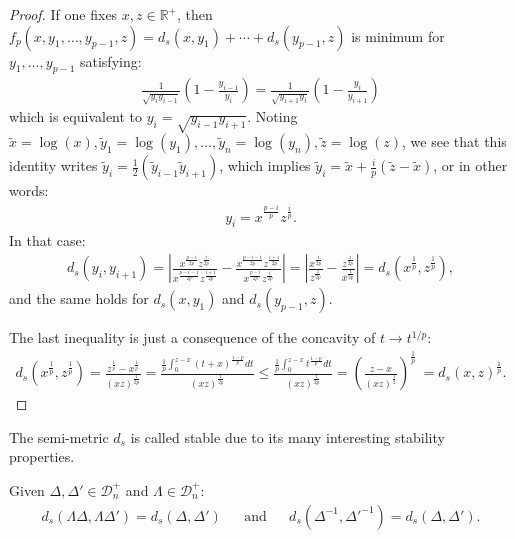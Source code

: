 \documentclass[a4papaer, titlepage]{book}
\begin{document}
\begin{proof}
   If one fixes $x,z \in \mathbb R^+$, then $f_p(x,y_1,\ldots, y_{p-1},z) = d_s(x,y_1) + \cdots + d_s(y_{p-1} ,z)$ is minimum for $y_1,\ldots, y_{p-1}$ satisfying:
   \begin{align*}
     \frac{1}{\sqrt{y_i y_{i-1}}} \left(1- \frac{y_{i-1}}{y_i}\right) = \frac{1}{\sqrt{y_{i+1} y_{i}}} \left(1- \frac{y_{i}}{y_{i+1}}\right)
   \end{align*}
   which is equivalent to $y_i = \sqrt{y_{i-1} y_{i+1}}$. Noting $\tilde x = \log(x),\tilde y_1 = \log({y_1}), \ldots, \tilde y_n = \log({y_n}), \tilde z = \log(z) $, we see that this identity writes $\tilde y_i = \frac{1}{2} (\tilde y_{i-1} \tilde y_{i+1})$, which implies $\tilde y_i = \tilde x + \frac{i}{p} (\tilde z - \tilde x)$, or in other words:
   \begin{align*}
     y_i = x^{\frac{p-i}{p}} z^{\frac{i}{p}}.
   \end{align*}
   In that case:
   \begin{align*}
     d_s(y_i, y_{i+1}) 
     = \left\vert \frac{x^{\frac{p-i}{2p}} z^{\frac{i}{2p}}}{x^{\frac{p-i -1}{2p}} z^{\frac{i+1}{2p}}} - \frac{x^{\frac{p-i -1}{2p}} z^{\frac{i+1}{2p}}}{x^{\frac{p-i}{2p}} z^{\frac{i}{2p}}} \right\vert
     = \left\vert \frac{x^{\frac{1}{2p} } }{z^{\frac{1}{2p} } } - \frac{z^{\frac{1}{2p} } }{x^{\frac{1}{2p} } }  \right\vert  = d_s \left( x^{\frac{1}{p}} , z^{\frac{1}{p}}   \right),
   \end{align*}
   and the same holds for $d_s(x, y_{1}) $ and $d_s(y_{p-1}, z) $.

   The last inequality is just a consequence of the concavity of $t\to t^{1/p}$:
   \begin{align*}
     d_s \left( x^{\frac{1}{p}} , z^{\frac{1}{p}}   \right)
     =  \frac{z^{\frac{1}{p}} - x^{\frac{1}{p}}}{(xz)^{\frac{1}{2p}} }  
     = \frac{\frac{1}{p}\int_0^{z-x} (t+x)^{\frac{1-p}{p}} dt}{(xz)^{\frac{1}{2p}} } 
     \leq \frac{\frac{1}{p}\int_0^{z-x} t^{\frac{1-p}{p}} dt}{(xz)^{\frac{1}{2p}} } 
      = \left( \frac{z - x}{(xz)^{\frac{1}{2}} }  \right)^{\frac{1}{p}} \! \! \! \ = d_s(x,z)^{\frac{1}{p}}.
   \end{align*}
  \end{proof} 

The semi-metric $d_s$ is called stable due to its many interesting stability properties.
\begin{property}\label{prot:stabilite_homotethie_distance_stable}
  Given $\Delta,\Delta' \in \mathcal D_n^+$ and $\Lambda \in \mathcal D_n^+$:
  \begin{align*}
     d_s \left(\Lambda \Delta, \Lambda \Delta'\right) 
    =d_s \left(\Delta, \Delta'\right)&
    &\text{and}&
    &d_s \left(\Delta^{-1}, \Delta'^{-1}\right) =d_s \left(\Delta, \Delta'\right).
  \end{align*}
\end{property}
\end{document}

